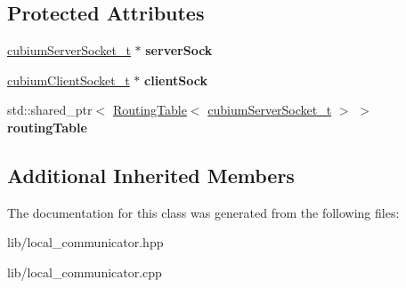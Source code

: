 \subsection*{Protected Attributes}
\begin{DoxyCompactItemize}
\item 
\mbox{\label{classLocalCommunicator_a4c0d8806e53030c1af6124cd55a34335}} 
\hyperlink{structcubiumServerSocket__t}{cubium\+Server\+Socket\+\_\+t} $\ast$ {\bfseries server\+Sock}
\item 
\mbox{\label{classLocalCommunicator_af52bd4819c3dc433bd27d3dbefbaac70}} 
\hyperlink{structcubiumClientSocket__t}{cubium\+Client\+Socket\+\_\+t} $\ast$ {\bfseries client\+Sock}
\item 
\mbox{\label{classLocalCommunicator_ac28392070111396dabbadbbcb81a7ef7}} 
std\+::shared\+\_\+ptr$<$ \hyperlink{classRoutingTable}{Routing\+Table}$<$ \hyperlink{structcubiumServerSocket__t}{cubium\+Server\+Socket\+\_\+t} $>$ $>$ {\bfseries routing\+Table}
\end{DoxyCompactItemize}
\subsection*{Additional Inherited Members}


The documentation for this class was generated from the following files\+:\begin{DoxyCompactItemize}
\item 
lib/local\+\_\+communicator.\+hpp\item 
lib/local\+\_\+communicator.\+cpp\end{DoxyCompactItemize}
